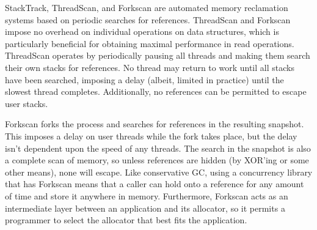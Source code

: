 StackTrack\cite{StackTrack}, ThreadScan\cite{Threadscan}, and Forkscan\cite{Forkscan} are automated memory reclamation systems based on periodic searches for references.  ThreadScan and Forkscan impose no overhead on individual operations on data structures, which is particularly beneficial for obtaining maximal performance in read operations.  ThreadScan operates by periodically pausing all threads and making them search their own stacks for references.  No thread may return to work until all stacks have been searched, imposing a delay (albeit, limited in practice) until the slowest thread completes.  Additionally, no references can be permitted to escape user stacks.

Forkscan forks the process and searches for references in the resulting snapshot.  This imposes a delay on user threads while the fork takes place, but the delay isn't dependent upon the speed of any threads.  The search in the snapshot is also a complete scan of memory, so unless references are hidden (by XOR'ing or some other means), none will escape.  Like conservative GC, using a concurrency library that has Forkscan means that a caller can hold onto a reference for any amount of time and store it anywhere in memory.  Furthermore, Forkscan acts as an intermediate layer between an application and its allocator, so it permits a programmer to select the allocator that best fits the application.
